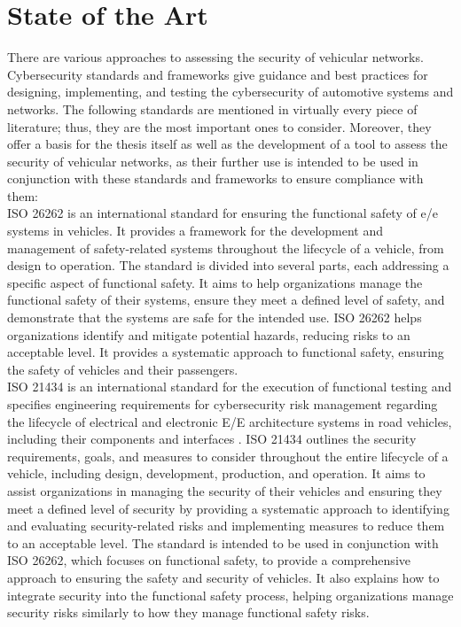 \chapter{State of the Art}
\label{chp:stateoftheart}

There are various approaches to assessing the security of vehicular networks. Cybersecurity standards and frameworks give guidance and best practices for designing, implementing, and testing the cybersecurity of automotive systems and networks. 
The following standards are mentioned in virtually every piece of literature; thus, they are the most important ones to consider. 
Moreover, they offer a basis for the thesis itself as well as the development of a tool to assess the security of vehicular networks,
as their further use is intended to be used in conjunction with these standards and frameworks to ensure compliance with them:\\

ISO 26262 is an international standard for ensuring the functional safety of \gls{e/e} systems in vehicles. 
It provides a framework for the development and management of safety-related systems throughout the lifecycle of a vehicle, from design to operation.
The standard is divided into several parts, each addressing a specific aspect of functional safety. 
It aims to help organizations manage the functional safety of their systems, ensure they meet a defined level of safety, and demonstrate that the systems are safe for the intended use.
ISO 26262 helps organizations identify and mitigate potential hazards, reducing risks to an acceptable level. 
It provides a systematic approach to functional safety, ensuring the safety of vehicles and their passengers.\\

ISO 21434 is an international standard for the execution of functional testing and specifies engineering requirements for cybersecurity risk 
management regarding the lifecycle of electrical and electronic E/E architecture systems in road vehicles, including their components and interfaces \cite{iso21434}.
ISO 21434 outlines the security requirements, goals, and measures to consider throughout the entire lifecycle of a vehicle, including design, development, production, and operation. 
It aims to assist organizations in managing the security of their vehicles and ensuring they meet a defined level of security by providing a systematic approach to identifying and evaluating security-related risks and implementing measures to reduce them to an acceptable level. 
The standard is intended to be used in conjunction with ISO 26262, which focuses on functional safety, to provide a comprehensive approach to ensuring the safety and security of vehicles. 
It also explains how to integrate security into the functional safety process, helping organizations manage security risks similarly to how they manage functional safety risks.\\

